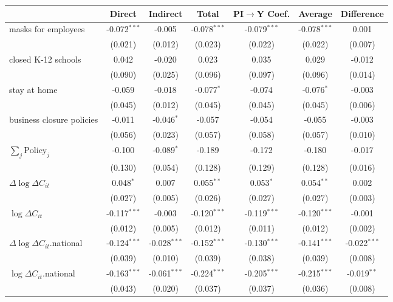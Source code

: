 
\begin{tabular}{lccccc|>{}c}
\toprule
  & Direct & Indirect & Total & PI$\to$Y Coef. & Average & Difference\\
\midrule
masks for employees & -0.072$^{***}$ & -0.005 & -0.078$^{***}$ & -0.079$^{***}$ & -0.078$^{***}$ & 0.001\\
 & (0.021) & (0.012) & (0.023) & (0.022) & (0.022) & (0.007)\\
closed K-12 schools & 0.042 & -0.020 & 0.023 & 0.035 & 0.029 & -0.012\\
 & (0.090) & (0.025) & (0.096) & (0.097) & (0.096) & (0.014)\\
stay at home & -0.059 & -0.018 & -0.077$^{*}$ & -0.074 & -0.076$^{*}$ & -0.003\\
 & (0.045) & (0.012) & (0.045) & (0.045) & (0.045) & (0.006)\\
business closure policies & -0.011 & -0.046$^{*}$ & -0.057 & -0.054 & -0.055 & -0.003\\
 & (0.056) & (0.023) & (0.057) & (0.058) & (0.057) & (0.010)\\
$\sum_j \mathrm{Policy}_j$ & -0.100 & -0.089$^{*}$ & -0.189 & -0.172 & -0.180 & -0.017\\
 & (0.130) & (0.054) & (0.128) & (0.129) & (0.128) & (0.016)\\
$\Delta \log \Delta C_{it}$ & 0.048$^{*}$ & 0.007 & 0.055$^{**}$ & 0.053$^{*}$ & 0.054$^{**}$ & 0.002\\
 & (0.027) & (0.005) & (0.026) & (0.027) & (0.027) & (0.003)\\
$\log \Delta C_{it}$ & -0.117$^{***}$ & -0.003 & -0.120$^{***}$ & -0.119$^{***}$ & -0.120$^{***}$ & -0.001\\
 & (0.012) & (0.005) & (0.012) & (0.011) & (0.012) & (0.002)\\
$\Delta \log \Delta C_{it}$.national & -0.124$^{***}$ & -0.028$^{***}$ & -0.152$^{***}$ & -0.130$^{***}$ & -0.141$^{***}$ & -0.022$^{***}$\\
 & (0.039) & (0.010) & (0.039) & (0.038) & (0.039) & (0.008)\\
$\log \Delta C_{it}$.national & -0.163$^{***}$ & -0.061$^{***}$ & -0.224$^{***}$ & -0.205$^{***}$ & -0.215$^{***}$ & -0.019$^{**}$\\
 & (0.043) & (0.020) & (0.037) & (0.037) & (0.036) & (0.008)\\
\bottomrule
\end{tabular}